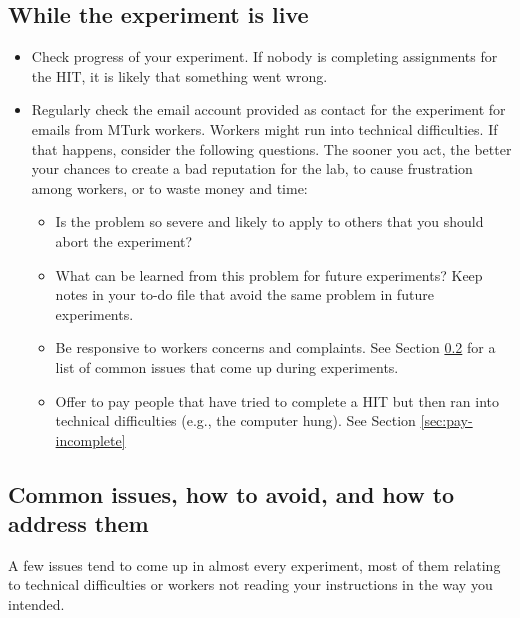 \documentclass{article}
\begin{document}
\subsection{While the experiment is live}
\begin{tcolorbox}[colback=gray!5,colframe=blue!40!black,title=Monitoring while the experiment is in progress]
\begin{itemize}
    \item Check progress of your experiment. If nobody is completing assignments for the HIT, it is likely that something went wrong. %
    \item Regularly check the email account provided as contact for the experiment for emails from MTurk workers. Workers might run into technical difficulties. If that happens, consider the following questions. The sooner you act, the better your chances to create a bad reputation for the lab, to cause frustration among workers, or to waste money and time:
    \begin{itemize}
    	\item Is the problem so severe and likely to apply to others that you should abort the experiment? 
	\item What can be learned from this problem for future experiments? Keep notes in your to-do file that avoid the same problem in future experiments. 
	\item Be responsive to workers concerns and complaints.  See  Section \ref{sec:common-concerns} for a list of common issues that come up during experiments.
	\item Offer to pay people that have tried to complete a HIT but then ran into technical difficulties (e.g., the computer hung). See Section \ref{sec:pay-incomplete}
   \end{itemize}
\end{itemize}
\end{tcolorbox}
   
\subsection{Common issues, how to avoid, and how to address them}\label{sec:common-concerns}

A few issues tend to come up in almost every experiment, most of them relating to technical difficulties or workers not reading your instructions in the way you intended.
\end{document}
